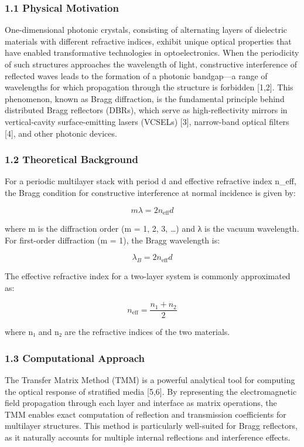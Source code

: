 \documentclass[
]{article}
\begin{document}
\subsubsection{1.1 Physical Motivation}\label{physical-motivation}

One-dimensional photonic crystals, consisting of alternating layers of
dielectric materials with different refractive indices, exhibit unique
optical properties that have enabled transformative technologies in
optoelectronics. When the periodicity of such structures approaches the
wavelength of light, constructive interference of reflected waves leads
to the formation of a photonic bandgap---a range of wavelengths for
which propagation through the structure is forbidden {[}1,2{]}. This
phenomenon, known as Bragg diffraction, is the fundamental principle
behind distributed Bragg reflectors (DBRs), which serve as
high-reflectivity mirrors in vertical-cavity surface-emitting lasers
(VCSELs) {[}3{]}, narrow-band optical filters {[}4{]}, and other
photonic devices.

\subsubsection{1.2 Theoretical Background}\label{theoretical-background}

For a periodic multilayer stack with period d and effective refractive
index n\_eff, the Bragg condition for constructive interference at
normal incidence is given by:

\[m\lambda = 2n_{\text{eff}}d\]

where m is the diffraction order (m = 1, 2, 3, \ldots) and λ is the
vacuum wavelength. For first-order diffraction (m = 1), the Bragg
wavelength is:

\[\lambda_B = 2n_{\text{eff}}d\]

The effective refractive index for a two-layer system is commonly
approximated as:

\[n_{\text{eff}} = \frac{n_1 + n_2}{2}\]

where n₁ and n₂ are the refractive indices of the two materials.

\subsubsection{1.3 Computational Approach}\label{computational-approach}

The Transfer Matrix Method (TMM) is a powerful analytical tool for
computing the optical response of stratified media {[}5,6{]}. By
representing the electromagnetic field propagation through each layer
and interface as matrix operations, the TMM enables exact computation of
reflection and transmission coefficients for multilayer structures. This
method is particularly well-suited for Bragg reflectors, as it naturally
accounts for multiple internal reflections and interference effects.
\end{document}
